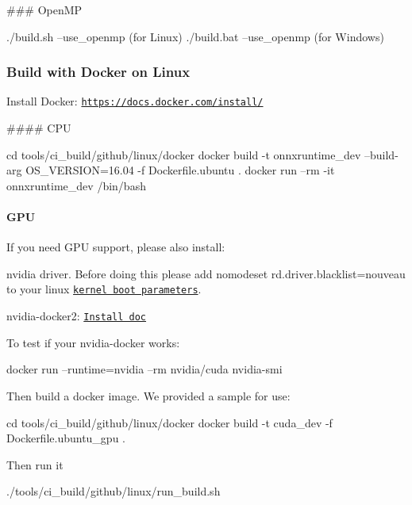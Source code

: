 \#\#\# Open\+MP 
\begin{DoxyCode}
./build.sh --use\_openmp (for Linux)
./build.bat --use\_openmp (for Windows)
\end{DoxyCode}


\subsubsection*{Build with Docker on Linux}

Install Docker\+: {\ttfamily \href{https://docs.docker.com/install/}{\tt https\+://docs.\+docker.\+com/install/}}

\#\#\#\# C\+PU 
\begin{DoxyCode}
cd tools/ci\_build/github/linux/docker
docker build -t onnxruntime\_dev --build-arg OS\_VERSION=16.04 -f Dockerfile.ubuntu .
docker run --rm -it onnxruntime\_dev /bin/bash
\end{DoxyCode}


\paragraph*{G\+PU}

If you need G\+PU support, please also install\+:
\begin{DoxyEnumerate}
\item nvidia driver. Before doing this please add \textquotesingle{}nomodeset rd.\+driver.\+blacklist=nouveau\textquotesingle{} to your linux \href{https://www.kernel.org/doc/html/v4.17/admin-guide/kernel-parameters.html}{\tt kernel boot parameters}.
\item nvidia-\/docker2\+: \href{`https://github.com/NVIDIA/nvidia-docker/wiki/Installation-(version-2.0)`}{\tt Install doc}
\end{DoxyEnumerate}

To test if your nvidia-\/docker works\+: 
\begin{DoxyCode}
docker run --runtime=nvidia --rm nvidia/cuda nvidia-smi
\end{DoxyCode}


Then build a docker image. We provided a sample for use\+: 
\begin{DoxyCode}
cd tools/ci\_build/github/linux/docker
docker build -t cuda\_dev -f Dockerfile.ubuntu\_gpu .
\end{DoxyCode}


Then run it 
\begin{DoxyCode}
./tools/ci\_build/github/linux/run\_build.sh
\end{DoxyCode}
 